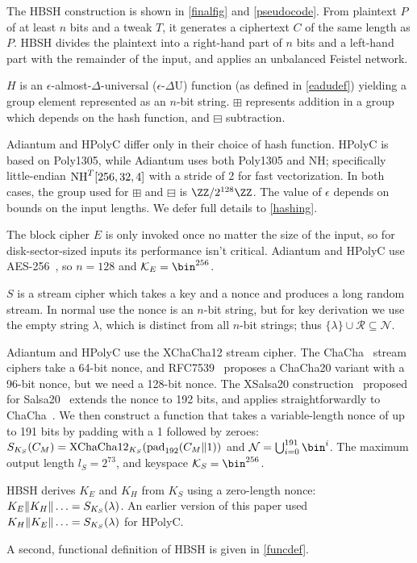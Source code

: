 \documentclass[eprint.tex]{subfiles}
\begin{document}
The HBSH construction is shown in \autoref{finalfig} and \autoref{pseudocode}.
From plaintext $P$ of at least $n$ bits and a tweak $T$,
it generates a ciphertext $C$ of the same length as $P$.
HBSH divides the plaintext into a right-hand part of $n$ bits and a left-hand part with
the remainder of the input, and applies an unbalanced Feistel network.

$H$
is an $\epsilon$-almost-$\Delta$-universal ($\epsilon$-$\Delta$U) function
(as defined in \autoref{eadudef})
yielding a group element represented as an $n$-bit string.
$\boxplus$ represents addition in a group which depends
on the hash function, and $\boxminus$ subtraction.

\begin{sloppypar}
    Adiantum and HPolyC differ only in their choice of hash function. HPolyC is
    based on Poly1305, while Adiantum uses both Poly1305 and NH;
    specifically little-endian $\operatorname{NH}^T[256, 32, 4]$ with a stride of 2 for fast
    vectorization. In both cases, the group used for $\boxplus$ and $\boxminus$ is
    $\ZZ/2^{128}\ZZ$. The value of $\epsilon$ depends on bounds on the input
    lengths.
    We defer full details to \autoref{hashing}.
\end{sloppypar}

The block cipher $E$
is only invoked once no matter the size of the input, so for disk-sector-sized inputs
its performance isn't critical. Adiantum and HPolyC use AES-256~\cite{AES}, so $n = 128$ and $\mathcal{K}_E = \bin^{256}$.

$S$
is a stream cipher which takes a key and a nonce and produces a long random stream. In normal use
the nonce is an $n$-bit string, but for key derivation we use the empty string $\lambda$, which
is distinct from all $n$-bit strings; thus $\{\lambda \} \cup \mathcal{R} \subseteq \mathcal{N}$.

Adiantum and HPolyC use the XChaCha12 stream cipher.
The ChaCha~\cite{chacha}
stream ciphers take a 64-bit nonce, and RFC7539~\cite{RFC7539} proposes
a ChaCha20 variant with a 96-bit nonce, but we need a 128-bit nonce.
The XSalsa20 construction~\cite{xsalsa}
proposed for Salsa20~\cite{salsa20,salsa812} extends the nonce to 192 bits, and
applies straightforwardly to ChaCha~\cite{xchacha,monocypher,libsodiumxchacha}.
We then construct a function that takes a variable-length nonce of up to
191 bits by padding with a 1 followed by zeroes:
$S_{K_S}(C_M) = \XChaCha12_{K_S}(\pad_{192}(C_M \Concat 1))$ and
$\mathcal{N} = \bigcup_{i=0}^{191}\bin^i$.
The maximum output length $l_S = 2^{73}$,
and keyspace $\mathcal{K}_S = \bin^{256}$.

HBSH derives $K_E$ and $K_H$ from $K_S$ using a zero-length nonce:
$K_E \Vert K_H \Vert \ldots = S_{K_S}(\lambda)$. An earlier version of this paper
used $K_H \Vert K_E \Vert \ldots = S_{K_S}(\lambda)$ for HPolyC.

A second, functional definition of HBSH is given in \autoref{funcdef}.

\subbib
\end{document}
